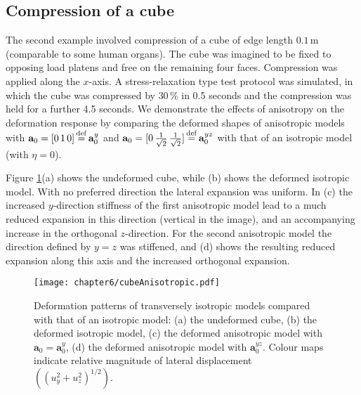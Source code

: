 	\subsection{Compression of a cube}
The second example involved compression of a cube of edge length $0.1\,$m (comparable to some human organs). The cube was imagined to be fixed to opposing load platens and free on the remaining four faces. Compression was applied along the $x$-axis. A stress-relaxation type test protocol was simulated, in which the cube was compressed by $30\, \%$ in 0.5 seconds and the compression was held for a further 4.5 seconds. We demonstrate the effects of anisotropy on the deformation response by comparing the deformed shapes of anisotropic models with $\mathbf{a}_0 = [0\, 1\, 0] \, {\buildrel\rm	def\over=} \, \mathbf{a}_0^y $ and $\mathbf{a}_0 = [0\, \frac{1}{\sqrt{2}} \, \frac{1}{\sqrt{2}}] \, {\buildrel\rm	def\over=} \, \mathbf{a}_0^{yz} $  with that of an isotropic model (with $\eta = 0$).

\bigskip

Figure \ref{chap6:fig-cubeAnisotropic}(a) shows the undeformed cube, while (b) shows the deformed isotropic model. With no preferred direction the lateral expansion was uniform. In (c) the increased $y$-direction stiffness of the first anisotropic model lead to a much reduced expansion in this direction (vertical in the image), and an accompanying increase in the orthogonal $z$-direction. For the second anisotropic model the direction defined by $y = z$ was stiffened, and (d) shows the resulting reduced expansion along this axis and the increased orthogonal expansion. 
%
\begin{figure}[h]
\begin{center}
\texttt{[image: chapter6/cubeAnisotropic.pdf]}
\end{center}
\caption[Deformation patterns of transversely isotropic models compared with that of an isotropic model]{Deformation patterns of transversely isotropic models compared with that of an isotropic model: (a) the undeformed cube, (b) the deformed isotropic model, (c) the deformed anisotropic model with $ \mathbf{a}_0 = \mathbf{a}_0^y $, (d) the deformed anisotropic model with $\mathbf{a}_0^{yz}$. Colour maps indicate relative magnitude of lateral displacement  $((u_y^2 + u_z^2)^{1/2})$.}
\label{chap6:fig-cubeAnisotropic}
\end{figure}

\bigskip

